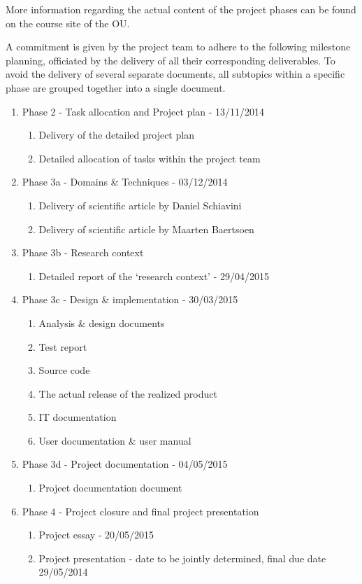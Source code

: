 More information regarding the actual content of the project phases can be found on the course site of the OU. 

A commitment is given by the project team to adhere to the following milestone planning, officiated by the delivery of all their corresponding deliverables. To avoid the delivery of several separate documents, all subtopics within a specific phase are grouped together into a single document.

 \begin{enumerate}
	\item Phase 2 - Task allocation and Project plan			- 	13/11/2014
 	\begin{enumerate}
		\item Delivery of the detailed project plan 			
		\item Detailed allocation of tasks within the project team 
	\end {enumerate}
	\item Phase 3a - Domains \& Techniques					- 	03/12/2014
 	\begin{enumerate}
		\item Delivery of scientific article by Daniel Schiavini
		\item Delivery of scientific article by Maarten Baertsoen
	\end {enumerate}
 	\item Phase 3b - Research context
 	\begin{enumerate}
		\item Detailed report of the `research context'  		- 	29/04/2015
	\end {enumerate}
 	\item Phase 3c - Design \& implementation				- 	30/03/2015
 	\begin{enumerate}
		\item Analysis \& design documents  				
		\item Test report  							
		\item Source code  					
		\item The actual release of the realized product  	
		\item IT documentation  			
		\item User documentation \& user manual  
	\end {enumerate}
 	\item Phase 3d - Project documentation					- 	04/05/2015
 	\begin{enumerate}
		\item Project documentation document	
	\end {enumerate}
	\item Phase 4 - Project closure and final project presentation
 	\begin{enumerate}
		\item Project essay							- 	20/05/2015
		\item Project presentation						- 	date to be jointly determined, final due date 29/05/2014
	\end {enumerate}
\end {enumerate}


